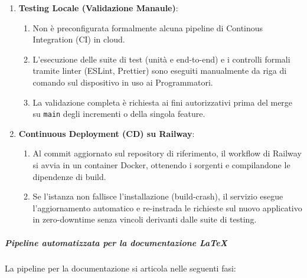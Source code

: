 \documentclass[a4paper, 11pt, oneside]{scrartcl}
\begin{document}
\begin{enumerate}
    \item \textbf{Testing Locale (Validazione Manaule)}:
    \begin{enumerate}[label=\alph*.]
        \item Non è preconfigurata formalmente alcuna pipeline di Continous Integration (CI) in cloud.
        \item L'esecuzione delle suite di test (unità e end-to-end) e i controlli formali tramite linter (ESLint, Prettier) sono eseguiti manualmente da riga di comando sul dispositivo in uso ai Programmatori.
        \item La validazione completa è richiesta ai fini autorizzativi prima del merge su \texttt{main} degli incrementi o della singola feature.
    \end{enumerate}
    \item \textbf{Continuous Deployment (CD) su Railway}:
    \begin{enumerate}[label=\alph*.]
        \item Al commit aggiornato sul repository di riferimento, il workflow di Railway si avvia in un container Docker, ottenendo i sorgenti e compilandone le dipendenze di build.
        \item Se l'istanza non fallisce l'installazione (build-crash), il servizio esegue l'aggiornamento automatico e re-instrada le richieste sul nuovo applicativo in zero-downtime senza vincoli derivanti dalle suite di testing.
    \end{enumerate}
\end{enumerate}

\subparagraph{Pipeline automatizzata per la documentazione \LaTeX{}}

La pipeline per la documentazione si articola nelle seguenti fasi:
\end{document}
